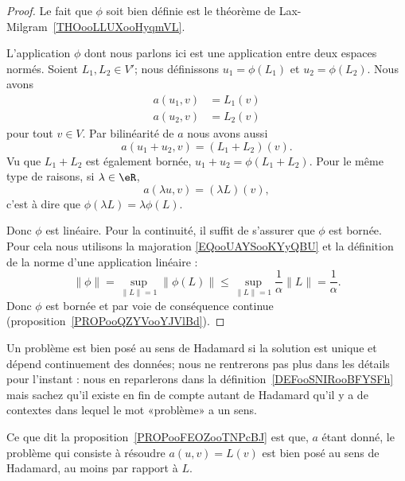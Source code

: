 \begin{proof}
    Le fait que \( \phi\) soit bien définie est le théorème de Lax-Milgram~\ref{THOooLLUXooHyqmVL}.

    L'application \( \phi\) dont nous parlons ici est une application entre deux espaces normés. Soient \( L_1,L_2\in V'\); nous définissons \( u_1=\phi(L_1)\) et \( u_2=\phi(L_2)\). Nous avons
    \begin{subequations}
        \begin{align}
            a(u_1,v)&=L_1(v)\\
            a(u_2,v)&=L_2(v)
        \end{align}
    \end{subequations}
    pour tout $v\in V$. Par bilinéarité de \( a\) nous avons aussi
    \begin{equation}
        a(u_1+u_2,v)=(L_1+L_2)(v).
    \end{equation}
    Vu que \( L_1+L_2\) est également bornée, \( u_1+u_2=\phi(L_1+L_2)\). Pour le même type de raisons, si \( \lambda\in \eR\),
    \begin{equation}
        a(\lambda u,v)=(\lambda L)(v),
    \end{equation}
    c'est à dire que \( \phi(\lambda L)=\lambda \phi(L)\).

    Donc \( \phi\) est linéaire. Pour la continuité, il suffit de s'assurer que \( \phi\) est bornée. Pour cela nous utilisons la majoration \eqref{EQooUAYSooKYyQBU} et la définition de la norme d'une application linéaire :
    \begin{equation}
        \| \phi \|=\sup_{\| L \|=1}\| \phi(L) \|\leq \sup_{\| L \|=1}\frac{1}{ \alpha }\| L \|=\frac{1}{ \alpha }.
    \end{equation}
    Donc \( \phi\) est bornée et par voie de conséquence continue (proposition~\ref{PROPooQZYVooYJVlBd}).
\end{proof}

Un problème est bien posé au sens de Hadamard si la solution est unique et dépend continuement des données; nous ne rentrerons pas plus dans les détails pour l'instant : nous en reparlerons dans la définition~\ref{DEFooSNIRooBFYSFh} mais sachez qu'il existe en fin de compte autant de Hadamard qu'il y a de contextes dans lequel le mot «problème» a un sens.

Ce que dit la proposition~\ref{PROPooFEOZooTNPcBJ} est que, \( a\) étant donné, le problème qui consiste à résoudre \( a(u,v)=L(v)\) est bien posé au sens de Hadamard, au moins par rapport à \( L\).

